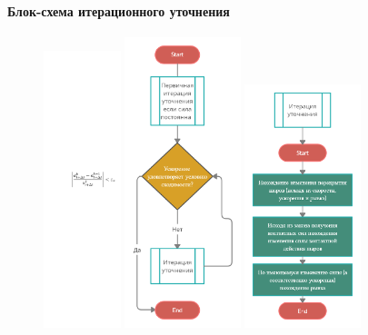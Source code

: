 \documentclass[c]{beamer}  %
\begin{document}
\begin{frame}
\frametitle{\insertsection} 
\framesubtitle{Блок-схема итерационного уточнения}

\begin{figure}[H]
	\centering
	\includegraphics[width=0.2\textwidth]{kriter_big}
	\includegraphics[width=0.3\textwidth]{iter_cicle} 
	\includegraphics[width=0.3\textwidth]{iter_one}
	\label{pic:iter}
\end{figure} 

\end{frame}
\end{document}
